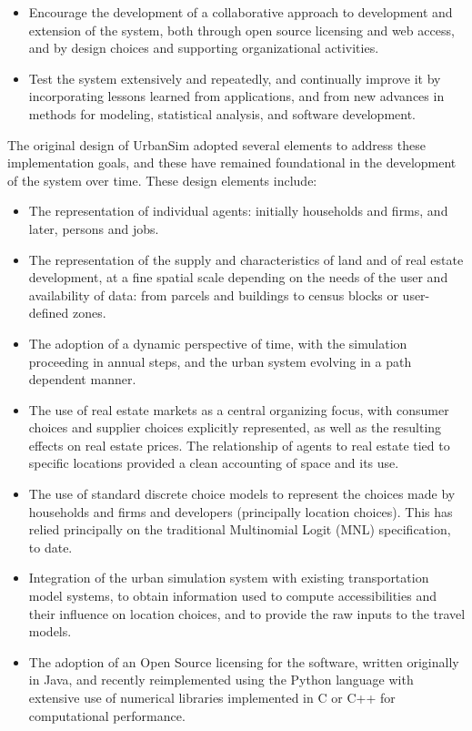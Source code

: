 \begin{itemize}
    \item Encourage the development of a collaborative approach to development and extension of the system, both through open source licensing and web access, and by design choices and supporting organizational activities.
    
    \item Test the system extensively and repeatedly, and continually improve it by incorporating lessons learned from applications, and from new advances in methods for modeling, statistical analysis, and software development.
    
\end{itemize}

The original design of UrbanSim adopted several elements to address these implementation goals, and these have remained foundational in the development of the system over time. These design elements include:

\begin{itemize}

    \item The representation of individual agents: initially households and firms, and later, persons and jobs.
    
    \item The representation of the supply and characteristics of land and of real estate development, at a fine spatial scale depending on the needs of the user and availability of data: from parcels and buildings to census blocks or user-defined zones.
    
    \item The adoption of a dynamic perspective of time, with the simulation proceeding in annual steps, and the urban system evolving in a path dependent manner.
    
    \item The use of real estate markets as a central organizing focus, with consumer choices and supplier choices explicitly represented, as well as the resulting effects on real estate prices. The relationship of agents to real estate tied to specific locations provided a clean accounting of space and its use.
    
    \item The use of standard discrete choice models to represent the choices made by households and firms and developers (principally location choices). This has relied principally on the traditional Multinomial Logit (MNL) specification, to date.
    
    \item Integration of the urban simulation system with existing transportation model systems, to obtain information used to compute accessibilities and their influence on location choices, and to provide the raw inputs to the travel models.
    
    \item The adoption of an Open Source licensing for the software, written originally in Java, and recently reimplemented using the Python language with extensive use of numerical libraries implemented in C or C++ for computational performance.

\end{itemize}

